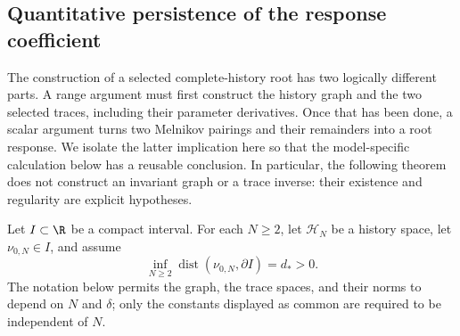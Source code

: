 \subsection{Quantitative persistence of the response coefficient}

The construction of a selected complete-history root has two logically
different parts.  A range argument must first construct the history graph and
the two selected traces, including their parameter derivatives.  Once that
has been done, a scalar argument turns two Melnikov pairings and their
remainders into a root response.  We isolate the latter implication here so
that the model-specific calculation below has a reusable conclusion.  In
particular, the following theorem does not construct an invariant graph or a
trace inverse: their existence and regularity are explicit hypotheses.

Let \(I\subset\R\) be a compact interval.  For each \(N\ge2\), let
\(\mathcal H_N\) be a history space, let
\(\nu_{0,N}\in I\), and assume
\begin{equation}
 \inf_{N\ge2}\operatorname{dist}(\nu_{0,N},\partial I)=d_*>0.
 \label{eq:abstract-center-buffer}
\end{equation}
The notation below permits the graph, the trace spaces, and their norms to
depend on \(N\) and \(\delta\); only the constants displayed as common are
required to be independent of \(N\).

